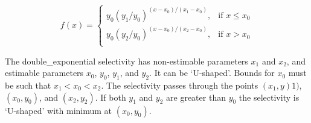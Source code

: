 \begin{equation} 
f(x)=\begin{cases}
	  y_0(y_1 / y_0)^{(x-x_0)/(x_1-x_0)}, & \text{if $x \le x_0$} \\
	  y_0(y_2 / y_0)^{(x-x_0)/(x_2-x_0)}, & \text{if $x > x_0$} \\
  \end{cases}
\end{equation}

The double\_exponential selectivity has non-estimable parameters $x_1$ and $x_2$, and estimable parameters $x_0$, $y_0$, $y_1$, and $y_2$. It can be `U-shaped'. Bounds for $x_0$ must be such that $x_1 < x_0 < x_2$. The selectivity passes through the points $(x_1, y)1)$, $(x_0, y_0)$, and $(x_2, y_2)$. If both $y_1$ and $y_2$ are greater than $y_0$ the selectivity is `U-shaped' with minimum at $(x_0, y_0)$.

